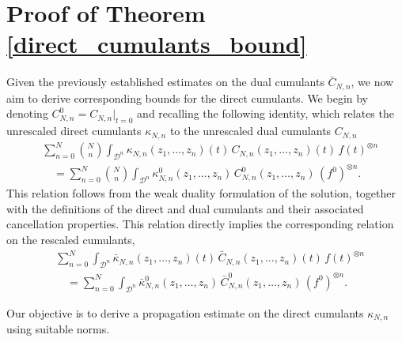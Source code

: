 \documentclass[pdflatex,sn-mathphys-num]{sn-jnl}
\theoremstyle{thmstyleone}%
\theoremstyle{thmstyletwo}%
\theoremstyle{thmstylethree}%
\begin{document}
\section{Proof of Theorem \ref{direct_cumulants_bound}}\label{sec4}

Given the previously established estimates on the dual cumulants
\( \bar{C}_{N,n} \), we now aim to derive corresponding bounds for the direct cumulants. We begin by denoting $C_{N,n}^0 = C_{N,n}|_{t=0}$ and recalling the following identity, which relates the unrescaled direct cumulants
\( \kappa_{N,n} \) to the unrescaled dual cumulants \( C_{N,n} \)
\begin{equation}\label{eq:direct_backward}
\begin{split}
&\sum_{n=0}^{N} \binom{N}{n}
\int_{\mathcal{D}^n} \kappa_{N,n}(z_1, \ldots, z_n)(t)\,
C_{N,n}(z_1, \ldots, z_n)(t)\, f(t)^{\otimes n}
\\
&\quad=
\sum_{n=0}^{N} \binom{N}{n}
\int_{\mathcal{D}^n} \kappa_{N,n}^{0}(z_1, \ldots, z_n)\,
C_{N,n}^{0}(z_1, \ldots, z_n)\, (f^0)^{\otimes n}.
\end{split}
\end{equation}
This relation follows from the weak duality formulation of the solution,
together with the definitions of the direct and dual cumulants and their
associated cancellation properties. This relation directly implies the corresponding relation on the rescaled cumulants,
\begin{equation}\label{eq:direct_backward_rescaled}
\begin{split}
&\sum_{n=0}^{N} 
\int_{\mathcal{D}^n} \bar \kappa_{N,n}(z_1, \ldots, z_n)(t)\,
\bar C_{N,n}(z_1, \ldots, z_n)(t)\, f(t)^{\otimes n}
\\
&\quad=
\sum_{n=0}^{N}
\int_{\mathcal{D}^n} \bar \kappa_{N,n}^{0}(z_1, \ldots, z_n)\,
\bar C_{N,n}^{0}(z_1, \ldots, z_n)\, (f^0)^{\otimes n}.
\end{split}
\end{equation}

Our objective is to derive a propagation estimate on the direct cumulants
\( \kappa_{N,n} \) using suitable norms.
\end{document}
